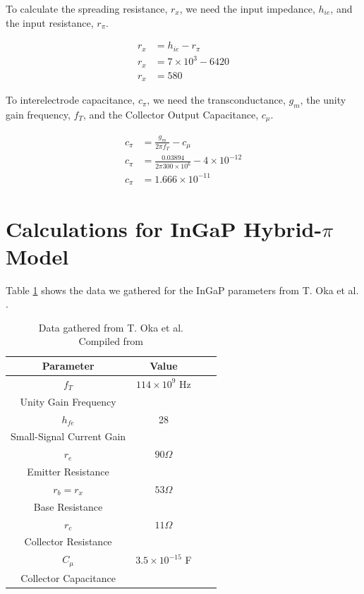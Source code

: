 \documentclass[conference]{IEEEtran}
\begin{document}
To calculate the spreading resistance, $r_x$, we need the input impedance, $h_{ie}$, and the input resistance, $r_{\pi}$.

\begin{equation}
    \begin{aligned}
        r_x &= h_{ie} - r_{\pi} \\
        r_x &= 7 \times 10^3 - 6420 \\
        r_x &= 580
    \end{aligned}
\end{equation}

To interelectrode capacitance, $c_{\pi}$, we need the transconductance, $g_m$, the unity gain frequency, $f_T$, and the
Collector Output Capacitance, $c_{\mu}$.

\begin{equation}
    \begin{aligned}
        c_{\pi} &= \frac{g_m}{2 \pi f_T} - c_{\mu} \\
        c_{\pi} &= \frac{0.03894}{2 \pi 300 \times 10^6} - 4 \times 10^{-12} \\
        c_{\pi} &= 1.666 \times 10^{-11}
    \end{aligned}
\end{equation}



\section{Calculations for InGaP Hybrid-$\pi$ Model}
\label{appendix-InGaP}

Table \ref{tab:InGaP-Params} shows the data we gathered for the InGaP parameters from T. Oka et al. \cite{Oka2001}.

\begin{table}[htbp]
    \centering
    \caption{Data gathered from T. Oka et al. \\ Compiled from \cite{Oka2001}}
    \begin{tabular}{|c|c|c|c|}
        \hline
        Parameter & Value\\
        \hline
        $f_T$ & $114 \times 10^9$ Hz \\
        Unity Gain Frequency & \\
        \hline
        $h_{fe}$ & 28 \\
        Small-Signal Current Gain & \\
        \hline
        $r_e$ & $90 \Omega$ \\
        Emitter Resistance & \\
        \hline
        $r_b = r_x$ & $53 \Omega$ \\
        Base Resistance & \\
        \hline
        $r_c$ & $11 \Omega$ \\
        Collector Resistance & \\
        \hline
        $C_{\mu}$ & $3.5 \times 10^{-15}$ F \\
        Collector Capacitance & \\
        \hline
    \end{tabular}
    \label{tab:InGaP-Params}
\end{table}
\end{document}
